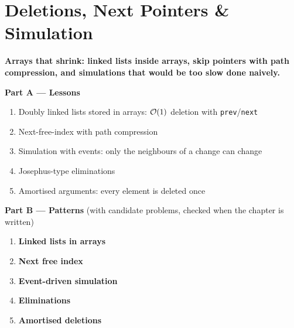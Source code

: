 \chapter{Deletions, Next Pointers \& Simulation}
\label{ch:linked_arrays}

\begin{tcolorbox}[enhanced, colback=white, colframe=secondaryblue, boxrule=1pt, arc=2mm]
\textbf{\large\textcolor{primaryblue}{Arrays that shrink: linked lists inside arrays, skip pointers with path compression, and simulations that would be too slow done naively.}}
\end{tcolorbox}


\begin{plannedbox}
\textbf{Part A --- Lessons}
\begin{enumerate}[leftmargin=*, label=\textbf{A\arabic*.}, itemsep=1pt]
    \item Doubly linked lists stored in arrays: $\mathcal{O}(1)$ deletion with \texttt{prev}/\texttt{next}
    \item Next-free-index with path compression
    \item Simulation with events: only the neighbours of a change can change
    \item Josephus-type eliminations
    \item Amortised arguments: every element is deleted once
\end{enumerate}
\textbf{Part B --- Patterns} (with candidate problems, checked when the chapter is written)
\begin{enumerate}[leftmargin=*, label=\textbf{P\arabic*.}, itemsep=1pt]
    \item \textbf{Linked lists in arrays}
    \item \textbf{Next free index}
    \item \textbf{Event-driven simulation}
    \item \textbf{Eliminations}
    \item \textbf{Amortised deletions}
\end{enumerate}
\end{plannedbox}

